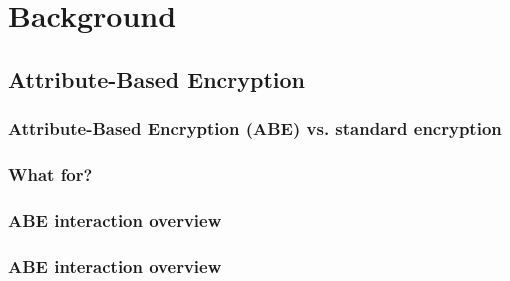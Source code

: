 \section{Background}
\subsection{Attribute-Based Encryption}
\begin{frame}[c]
    \frametitle{Attribute-Based Encryption (ABE) vs. standard encryption}
    \begin{center}
        
    \end{center}
\end{frame}

\begin{frame}[c]
    \frametitle{What for?}
    \centering
    

\end{frame}



\begin{frame}[c]
    \frametitle{ABE interaction overview}
    
\end{frame}

\begin{frame}[c]
    \frametitle{ABE interaction overview}
    
\end{frame}

